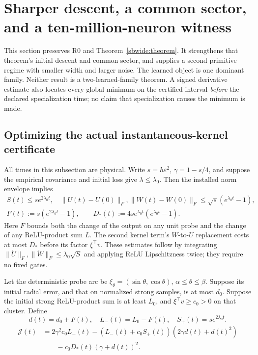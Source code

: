 \documentclass[11pt]{article}
\theoremstyle{remark}
\begin{document}
\section{Sharper descent, a common sector, and a ten-million-neuron witness}
\label{sbsharp:scope}

This section preserves R0 and Theorem~\ref{sbwide:theorem}. It strengthens
that theorem's initial descent and common sector, and supplies a second
primitive regime with smaller width and larger noise. The learned object
is one dominant family. Neither result is a two-learned-family theorem.
A signed derivative estimate also locates every global minimum on the
certified interval \emph{before} the declared specialization time; no
claim that specialization causes the minimum is made.

\subsection{Optimizing the actual instantaneous-kernel certificate}

All times in this subsection are physical. Write $s=h\varepsilon^2$,
$\gamma=1-s/4$, and suppose the empirical covariance and initial loss give
$\lambda\le\lambda_0$. Then the installed norm envelope implies
\begin{gather*}
 S(t)\le s e^{2\lambda_0t},\quad
 \|U(t)-U(0)\|_F,\|W(t)-W(0)\|_F
       \le\sqrt{s}(e^{\lambda_0t}-1),\\
 F(t):=s(e^{2\lambda_0t}-1),\qquad
 D_*(t):=4s e^{\lambda_0t}(e^{\lambda_0t}-1).
\end{gather*}
Here $F$ bounds both the change of the output on any unit probe and the
change of any ReLU-product sum $L$. The second kernel term's
$W$-to-$U$ replacement costs at most $D_*$ before its factor
$\xi^\top v$. These estimates follow by integrating
$\|\dot U\|_F,\|\dot W\|_F\le\lambda_0\sqrt S$ and applying
ReLU Lipschitzness twice; they require no fixed gates.

Let the deterministic probe arc be
$\xi_\theta=(\sin\theta,\cos\theta)$, $\alpha\le\theta\le\beta$.
Suppose its initial radial error, and that on normalized strong samples,
is at most $d_0$. Suppose the initial strong ReLU-product sum is at least
$L_0$, and $\xi^\top v\ge c_0>0$ on that cluster. Define
\[
 d(t)=d_0+F(t),\quad L_-(t)=L_0-F(t),\quad S_+(t)=se^{2\lambda_0t}.
\]
\begin{align*}
 \mathcal J(t)&=2\gamma^2c_0 L_-(t)
 -(L_-(t)+c_0S_+(t))(2\gamma d(t)+d(t)^2)\\
 &\hspace{2em}-c_0D_*(t)(\gamma+d(t))^2.
\end{align*}
\end{document}
